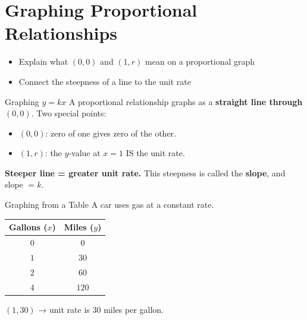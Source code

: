 \section{Graphing Proportional Relationships}

\begin{learningGoals}
\begin{itemize}
    \item Explain what $(0, 0)$ and $(1, r)$ mean on a proportional graph
    \item Connect the steepness of a line to the unit rate
\end{itemize}
\end{learningGoals}

\begin{conceptBox}{Graphing $y = kx$}
A proportional relationship graphs as a \textbf{straight line through} $(0, 0)$.
Two special points:
\begin{itemize}[leftmargin=*]
    \item $(0, 0)$: zero of one gives zero of the other.
    \item $(1, r)$: the $y$-value at $x = 1$ IS the unit rate.
\end{itemize}
\textbf{Steeper line = greater unit rate.} This steepness is called the \textbf{slope}, and slope $= k$.
\end{conceptBox}

\begin{workedExample}{Graphing from a Table}
A car uses gas at a constant rate.
\begin{center}
\begin{tabular}{|c|c|}
\hline \textbf{Gallons} ($x$) & \textbf{Miles} ($y$) \\ \hline
$0$ & $0$ \\ $1$ & $30$ \\ $2$ & $60$ \\ $4$ & $120$ \\ \hline
\end{tabular}
\end{center}
\begin{center}
\end{center}
$(1, 30)$ → unit rate is $30$ miles per gallon.
\end{workedExample}

